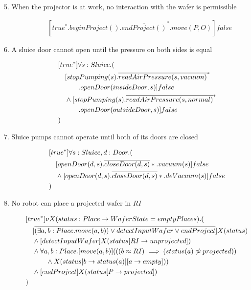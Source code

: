 \begin{description}
 
 \item[5. When the projector is at work, no interaction with the wafer is permissible]
 	\begin{align*}
 		&[true^*.beginProject().\overline{endProject()}^*.move(P,O)]false
	\end{align*}
	
 \item[6. A sluice door cannot open until the pressure on both sides is equal]
	\begin{align*}
&[true^*]\forall s:Sluice . ( \\
&\tab  [stopPumping(s).\overline{readAirPressure(s, vacuum)}^*\\
&\tab\tab\tab.openDoor(insideDoor,s)]false \\
&\tab  \wedge [stopPumping(s).\overline{readAirPressure(s, normal)}^*\\
&\tab\tab\tab.openDoor(outsideDoor,s)]false \\
&)		
	\end{align*}
	
 \item[7. Sluice pumps cannot operate until both of its doors are closed]
 
 \begin{align*}
 &[true^*]\forall s:Sluice, d:Door . ( \\
 &\hspace{1em} [openDoor(d,s).\overline{closeDoor(d,s)}*.vacuum(s)]false \\
 &\hspace{1em} \wedge [openDoor(d,s).\overline{closeDoor(d,s)}*.deVacuum(s)]false \\
 &)
 \end{align*}

 \item[8. No robot can place a projected wafer in $RI$]

\begin{align*}
&[true^*] \nu X(status:Place \to WaferState=emptyPlaces).( \\
&\tab  [\overline{(\exists a,b:Place.move(a,b)) \vee detectInputWafer \vee endProject}]X(status) \\
&\tab  \wedge [detectInputWafer]X(status[RI \to unprojected]) \\
&\tab  \wedge \forall a,b:Place.[move(a, b)](((b \approx RI) \implies (status(a) \not \approx projected)) \\
&\tab\tab\tab \wedge X(status[b \to status(a)][a \to empty])) \\
&\tab  \wedge [endProject]X(status[P \to projected]) \\
&)
\end{align*}


\end{description}
